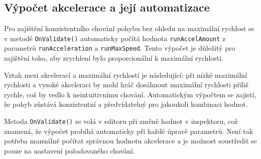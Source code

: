\subsection{Výpočet akcelerace a její automatizace}

Pro zajištění konzistentního chování pohybu bez ohledu na maximální rychlost se v metodě \texttt{OnValidate()} automaticky počítá hodnota \texttt{runAccelAmount} z parametrů \texttt{runAcceleration} a \texttt{runMaxSpeed}. Tento výpočet je důležitý pro zajištění toho, aby zrychlení bylo proporcionální k maximální rychlosti.

Vztah mezi akcelerací a maximální rychlostí je následující: při nízké maximální rychlosti a vysoké akceleraci by mohl hráč dosáhnout maximální rychlosti příliš rychle, což by vedlo k neintuitivnímu chování. Automatickým výpočtem se zajistí, že pohyb zůstává konzistentní a předvídatelný pro jakoukoli kombinaci hodnot.

Metoda \texttt{OnValidate()} se volá v editoru při změně hodnot v inspektoru, což znamená, že výpočet probíhá automaticky při každé úpravě parametrů. Není tak potřeba manuálně počítat správnou hodnotu akcelerace a je možnost soustředit se pouze na nastavení požadovaného chování.